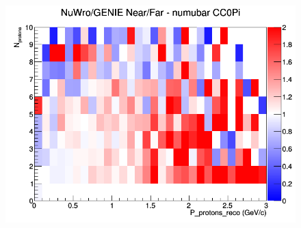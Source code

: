 \begin{figure}[h]
\endminipage
{}
\includegraphics[width=\linewidth]{eff_N_P/LAr/protons/ratios/CC0Pi_NuWro_GENIE_numubar_NF_N_P.png}
\endminipage
\newline
\end{figure}
\clearpage

